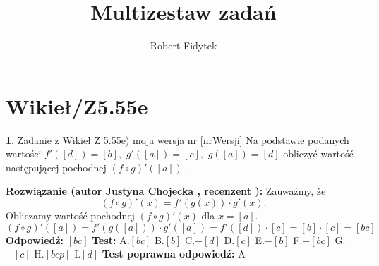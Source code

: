 \documentclass[12pt, a4paper]{article}
\title{Multizestaw zadań}
\author{Robert Fidytek}
\date{}
\theoremstyle{definition} %
\newtheorem{zad}{}
\newcommand{\kategoria}[1]{\section{#1}} %
\newcommand{\zadStart}[1]{\begin{zad}#1\newline} %
\newcommand{\zadStop}{\end{zad}}   %
\newcommand{\rozwStart}[2]{\noindent \textbf{Rozwiązanie (autor #1 , recenzent #2): }\newline} %
\newcommand{\rozwStop}{\newline}                                            %
\newcommand{\odpStart}{\noindent \textbf{Odpowiedź:}\newline}    %
\newcommand{\odpStop}{\newline}                                             %
\newcommand{\testStart}{\noindent \textbf{Test:}\newline} %
\newcommand{\testStop}{\newline} %
\newcommand{\kluczStart}{\noindent \textbf{Test poprawna odpowiedź:}\newline} %
\newcommand{\kluczStop}{\newline} %
\begin{document}
\maketitle


\kategoria{Wikieł/Z5.55e}
\zadStart{Zadanie z Wikieł Z 5.55e) moja wersja nr [nrWersji]}
Na podstawie podanych wartości $f'([d])=[b],$ $g'([a])=[c],$ $g([a])=[d]$ obliczyć wartość następującej pochodnej $(f\circ g)'([a])$.
\zadStop
\rozwStart{Justyna Chojecka}{}
Zauważmy, że 
$$(f\circ g)'(x)=f'(g(x))\cdot g'(x).$$
Obliczamy wartość pochodnej $(f\circ g)'(x)$ dla $x=[a]$.
$$(f\circ g)'([a])=f'(g([a]))\cdot g'([a])=f'([d])\cdot [c]=[b]\cdot [c]=[bc]$$
\rozwStop
\odpStart
$[bc]$
\odpStop
\testStart
A.$[bc]$
B.$[b]$
C.$-[d]$
D.$[c]$
E.$-[b]$
F.$-[bc]$
G.$-[c]$
H.$[bcp]$
I.$[d]$
\testStop
\kluczStart
A
\kluczStop
\end{document}
